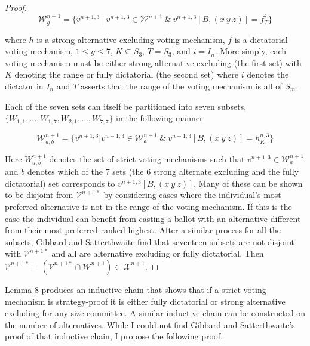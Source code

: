 \documentclass{amsart}
\theoremstyle{plain}
\begin{document}
\begin{proof}
\begin{equation*}
    \mathcal{W}_g^{n+1} = \{v^{n+1,3} \: | \: v^{n+1,3} \in \mathcal{W}^{n+1} \: \& \: v^{n+1,3}[B, (x \: y \: z)] = f_T^{i}\}
\end{equation*}

\vskip 0.25cm

 \noindent where $h$ is a strong alternative excluding voting mechanism, $f$ is a dictatorial voting mechanism, $1 \le g \le 7$, $K \subseteq S_3$, $T = S_3$, and $i = I_n$. More simply, each voting mechanism must be either strong alternative excluding (the first set) with $K$ denoting the range or fully dictatorial (the second set) where $i$ denotes the dictator in $I_n$ and $T$ asserts that the range of the voting mechanism is all of $S_m$.

Each of the seven sets can itself be partitioned into seven subsets, $\{W_{1,1}, ... , W_{1,7}, W_{2,1}, ... , W_{7,7}\}$ in the following manner:

\begin{equation*}
    \mathcal{W}_{a,b}^{n+1} = \{v^{n+1,3} | v^{n+1,3} \in \mathcal{W}_a^{n+1} \: \& \: v^{n+1,3}[B, (x \: y \: z)] = h_K^{n,3}\}
\end{equation*}

\vskip 0.25cm

\noindent Here $W_{a,b}^{n+1}$ denotes the set of strict voting mechanisms such that $v^{n+1,3} \in \mathcal{W}_a^{n+1}$ and $b$ denotes which of the 7 sets (the 6 strong alternate excluding and the fully dictatorial) set corresponds to $v^{n+1,3}[B, (x \: y \: z)]$. Many of these can be shown to be disjoint from $\mathcal{V}^{n+1*}$ by considering cases where the individual's most preferred alternative is not in the range of the voting mechanism. If this is the case the individual can benefit from casting a ballot with an alternative different from their most preferred ranked highest. After a similar process for all the subsets, Gibbard and Satterthwaite find that seventeen subsets are not disjoint with $\mathcal{V}^{n+1*}$ and all are alternative excluding or fully dictatorial. Then $\mathcal{V}^{n+1*} = (\mathcal{V}^{n+1*} \cap \mathcal{W}^{n+1}) \subset \mathcal{X}^{n+1}$.
\end{proof}

Lemma 8 produces an inductive chain that shows that if a strict voting mechanism is strategy-proof it is either fully dictatorial or strong alternative excluding for any size committee. A similar inductive chain can be constructed on the number of alternatives. While I could not find Gibbard and Satterthwaite's proof of that inductive chain, I propose the following proof.
\end{document}
